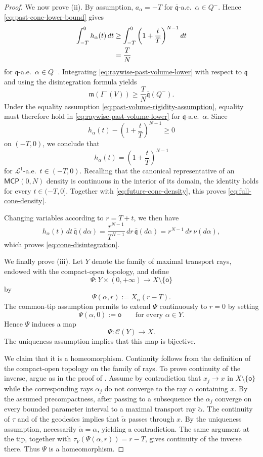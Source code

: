 \documentclass[a4paper,10pt]{article}
\newcommand{\mm}{\mathfrak m}
\newcommand{\qq}{\mathfrak q}
\theoremstyle{plain}
\theoremstyle{definition}
\numberwithin{equation}{section}
\begin{document}
\begin{proof}
We now prove {\rm (ii)}. By assumption,
$a_\alpha=-T$ for $\bar{\qq}$-a.e.\ $\alpha\in Q^-$. Hence
\eqref{eq:past-cone-lower-bound} gives
\begin{align}
    \int_{-T}^{0}h_\alpha(t)\,dt
    &\geq
    \int_{-T}^{0}
    \left(1+\frac{t}{T}\right)^{N-1}dt \notag\\
    &=
    \frac{T}{N}
    \label{eq:raywise-past-volume-lower}
\end{align}
for $\bar{\qq}$-a.e.\ $\alpha\in Q^-$. Integrating
\eqref{eq:raywise-past-volume-lower} with respect to $\bar{\qq}$ and
using the disintegration formula yields
\begin{equation}\label{eq:global-past-volume-lower}
    \mm(I^-(V))
    \geq
    \frac{T}{N}\bar{\qq}(Q^-).
\end{equation}
Under the equality assumption
\eqref{eq:past-volume-rigidity-assumption}, equality must therefore
hold in \eqref{eq:raywise-past-volume-lower} for
$\bar{\qq}$-a.e.\ $\alpha$. Since
\[
    h_\alpha(t)
    -
    \left(1+\frac{t}{T}\right)^{N-1}
    \geq0
\]
on $(-T,0)$, we conclude that
\[
    h_\alpha(t)
    =
    \left(1+\frac{t}{T}\right)^{N-1}
\]
for $\mathcal L^1$-a.e.\ $t\in(-T,0)$. Recalling that the canonical
representative of an $\mathsf{MCP}(0,N)$ density is continuous in the
interior of its domain, the identity holds for every
$t\in(-T,0]$. Together with \eqref{eq:future-cone-density}, this proves
\eqref{eq:full-cone-density}.

Changing variables according to $r=T+t$, we then have
\[
    h_\alpha(t)\,dt\,\bar{\qq}(d\alpha)
    =
    \frac{r^{N-1}}{T^{N-1}}\,dr\,
    \bar{\qq}(d\alpha)
    =
    r^{N-1}\,dr\,\nu(d\alpha),
\]
which proves \eqref{eq:cone-disintegration}.

We finally prove {\rm (iii)}. Let $Y$ denote the family of maximal
transport rays, endowed with the compact-open topology, and define
\[
    \Psi:Y\times(0,+\infty)\longrightarrow X\setminus\{\mathsf o\}
\]
by
\[
    \Psi(\alpha,r)
    :=
    X_\alpha(r-T).
\]
The common-tip assumption permits to extend $\Psi$ continuously to
$r=0$ by setting
\[
    \Psi(\alpha,0):=\mathsf o
    \qquad\text{for every }\alpha\in Y.
\]
Hence $\Psi$ induces a map
\[
    \Psi:\mathcal C(Y)\longrightarrow X.
\]
The uniqueness assumption implies that this map is bijective.

We claim that it is a homeomorphism. Continuity follows from the
definition of the compact-open topology on the family of rays. To
prove continuity of the inverse, argue as in the proof of
\cite[Lemma~5.4]{OhtaJLMS}. Assume by contradiction that
$x_j\to x$ in $X\setminus\{\mathsf o\}$ while the corresponding rays
$\alpha_j$ do not converge to the ray $\alpha$ containing $x$.
By the assumed precompactness, after passing to a subsequence the
$\alpha_j$ converge on every bounded parameter interval to a maximal
transport ray $\tilde\alpha$. The continuity of $\tau$ and of the
geodesics implies that $\tilde\alpha$ passes through $x$. By the
uniqueness assumption, necessarily $\tilde\alpha=\alpha$, yielding a
contradiction. The same argument at the tip, together with
$\tau_V(\Psi(\alpha,r))=r-T$, gives continuity of the inverse there.
Thus $\Psi$ is a homeomorphism.


\end{proof}
\end{document}

